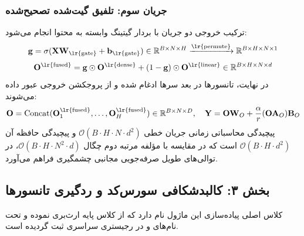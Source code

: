 \subsubsection*{جریان سوم: تلفیق گیت‌شده تصحیح‌شده }
ترکیب خروجی دو جریان با بردار گیتینگ وابسته به محتوا انجام می‌شود:
\begin{equation}
    \mathbf{g} = \sigma(\mathbf{X}\mathbf{W}_{\text{\lr{gate}}} + \mathbf{b}_{\text{\lr{gate}}}) \in \mathbb{R}^{B \times N \times H} \xrightarrow{\text{\lr{permute}}} \mathbb{R}^{B \times H \times N \times 1}
\end{equation}
\begin{equation}
    \mathbf{O}^{\text{\lr{fused}}} = \mathbf{g} \odot \mathbf{O}^{\text{\lr{dense}}} + (1 - \mathbf{g}) \odot \mathbf{O}^{\text{\lr{linear}}} \in \mathbb{R}^{B \times H \times N \times d}
\end{equation}
در نهایت، تانسورها در بعد سرها ادغام شده و از پروجکشن خروجی عبور داده می‌شوند:
\begin{equation}
    \mathbf{O} = \operatorname{Concat}(\mathbf{O}_1^{\text{\lr{fused}}}, \dots, \mathbf{O}_H^{\text{\lr{fused}}}) \in \mathbb{R}^{B \times N \times D}, \quad \mathbf{Y} = \mathbf{O}\mathbf{W}_O + \frac{\alpha}{r}(\mathbf{O}\mathbf{A}_O)\mathbf{B}_O
\end{equation}
پیچیدگی محاسباتی زمانی جریان خطی $\mathcal{O}(B \cdot H \cdot N \cdot d^2)$ و پیچیدگی حافظه آن $\mathcal{O}(B \cdot H \cdot d^2)$ است که در مقایسه با مؤلفه مرتبه دوم چگال $\mathcal{O}(B \cdot H \cdot N^2 \cdot d)$، در توالی‌های طویل صرفه‌جویی مجانبی چشمگیری فراهم می‌آورد.

\subsection*{بخش ۳: کالبدشکافی سورس‌کد و ردگیری تانسورها }
کلاس اصلی پیاده‌سازی این ماژول  نام دارد که از کلاس پایه  ارث‌بری نموده و تحت نام‌های  و  در رجیستری سراسری ثبت گردیده است. 

